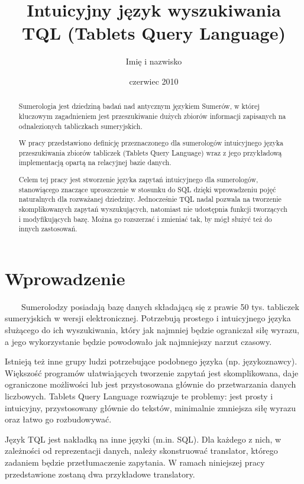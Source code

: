 \documentclass{pracamgr}
\author{Imię i nazwisko}
\title{Intuicyjny język wyszukiwania TQL (Tablets Query Language)}
\date{czerwiec 2010}
\begin{document}
\maketitle

\begin{abstract}
Sumerologia jest dziedziną badań nad antycznym językiem Sumerów, w której
kluczowym zagadnieniem jest przeszukiwanie dużych zbiorów informacji
zapisanych na odnalezionych tabliczkach sumeryjskich.

W pracy przedstawiono definicję przeznaczonego dla sumerologów intuicyjnego
języka przeszukiwania zbiorów tabliczek (Tablets Query Language) wraz z jego
przykładową implementacją opartą na relacyjnej bazie danych.

Celem tej pracy jest stworzenie języka zapytań intuicyjnego dla sumerologów,
stanowiącego znaczące uproszczenie w stosunku do SQL dzięki wprowadzeniu pojęć 
naturalnych dla rozważanej dziedziny. Jednocześnie TQL nadal
pozwala na tworzenie skomplikowanych zapytań wyszukujących, natomiast nie 
udostępnia funkcji tworzących i modyfikujących bazę. Można go rozszerzać 
i zmieniać tak, by mógł służyć też do innych zastosowań.
\end{abstract}

\tableofcontents

\chapter*{Wprowadzenie}

\ \ \ \ Sumerolodzy posiadają bazę danych składającą się z prawie 50 tys. tabliczek sumeryjskich w wersji elektronicznej. Potrzebują prostego i intuicyjnego języka służącego do ich wyszukiwania, który jak najmniej będzie ograniczał siłę wyrazu, a jego wykorzystanie będzie powodowało jak najmniejszy narzut czasowy.

  Istnieją też inne grupy ludzi potrzebujące podobnego języka (np. językoznawcy). Większość programów ułatwiających tworzenie zapytań jest skomplikowana, daje ograniczone możliwości lub jest przystosowana głównie do przetwarzania danych liczbowych. Tablets Query Language rozwiązuje te problemy: jest prosty i intuicyjny, przystosowany głównie do tekstów, minimalnie zmniejsza siłę wyrazu oraz łatwo go rozbudowywać. 

  Język TQL jest nakładką na inne języki (m.in. SQL). Dla każdego z nich, w zależności od reprezentacji danych, należy skonstruować translator, którego zadaniem będzie przetłumaczenie zapytania. W ramach niniejszej pracy przedstawione zostaną dwa przykładowe translatory.
\end{document}
